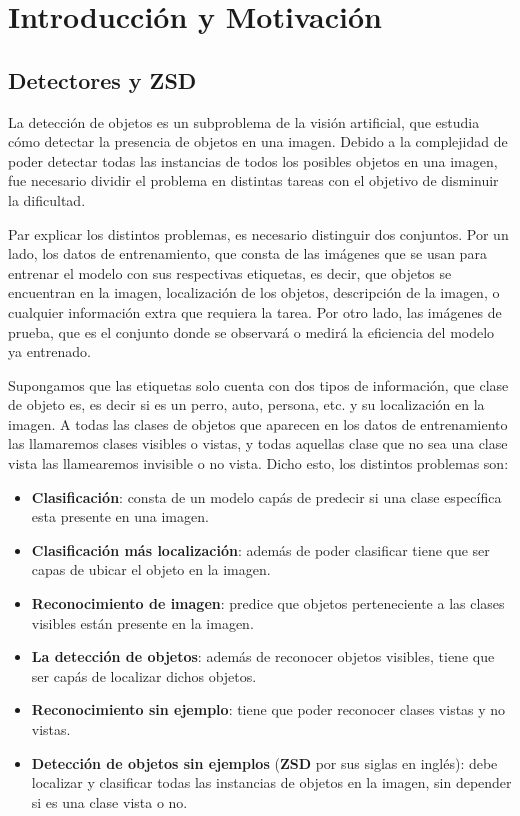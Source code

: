 \chapter{Introducción y Motivación} \label{cap:intro}

\section{Detectores y ZSD} \label{sec:detectoresyzsd}
La detección de objetos es un subproblema de la visión artificial, que estudia cómo detectar la presencia de objetos en una imagen. Debido a la complejidad de poder detectar todas las instancias de todos los posibles objetos en una imagen, fue necesario dividir el problema  en distintas tareas con el objetivo de disminuir la dificultad. 

Par explicar los distintos problemas, es necesario distinguir dos conjuntos. Por un lado, los datos de entrenamiento, que consta de las imágenes que se usan para entrenar el modelo con sus respectivas etiquetas, es decir, que objetos se encuentran en la imagen, localización de los objetos, descripción de la imagen, o cualquier información extra que requiera la tarea. Por otro lado, las imágenes de prueba, que es el conjunto donde se observará o medirá la eficiencia del modelo ya entrenado. 

Supongamos que las etiquetas solo cuenta con dos tipos de información, que clase de objeto es, es decir si es un perro, auto, persona, etc. y su localización en la imagen. A todas las clases de objetos que aparecen en los datos de entrenamiento las llamaremos clases visibles o vistas, y todas aquellas clase que no sea una clase vista las llamearemos invisible o no vista. Dicho esto, los distintos problemas son:

\begin{itemize}
	\item \textbf{Clasificación}: consta de un modelo capás de predecir si una clase específica esta presente en una imagen. 
	\item \textbf{Clasificación más localización}: además de poder clasificar tiene que ser capas de ubicar el objeto en la imagen.
	\item \textbf{Reconocimiento de imagen}: predice que objetos perteneciente a las clases visibles están presente en la imagen. 
	\item \textbf{La detección de objetos}: además de reconocer objetos visibles, tiene que ser capás de localizar dichos objetos. 
	\item \textbf{Reconocimiento sin ejemplo}: tiene que poder reconocer clases vistas y no vistas.
	\item \textbf{Detección de objetos sin ejemplos} (\textbf{ZSD} por sus siglas en inglés): debe localizar y clasificar todas las instancias de objetos en la imagen, sin depender si es una clase vista o no.
\end{itemize}


